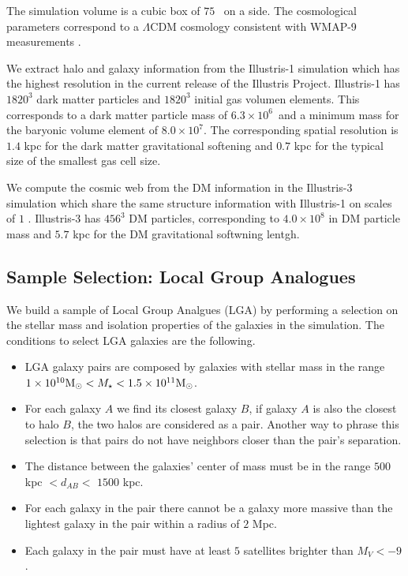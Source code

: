 \documentclass[useAMS,usenatbib,usegraphicx]{mn2e}
\newcommand{\hMpc}{{\ifmmode{h^{-1}{\rm Mpc}}\else{$h^{-1}$Mpc}\fi}}
\newcommand{\Mpc}{{\ifmmode{{\rm Mpc}}\else{Mpc}\fi}}
\newcommand{\Msun}{{\ifmmode{{\rm{M_{\odot}}}}\else{${\rm{M_{\odot}}}$}\fi}}
\begin{document}
The simulation volume is a cubic box of $75$ \hMpc\ on a side.
The cosmological parameters correspond to a $\Lambda$CDM cosmology
consistent with WMAP-9 measurements \citep{2013ApJS..208...19H}. 

We extract halo and galaxy information from the Illustris-1 simulation
which has the highest resolution in the current release of the
Illustris Project.
Illustris-1 has $1820^3$ dark matter particles and $1820^3$ initial gas
volumen elements. 
This corresponds to a dark matter particle mass of
$6.3\times 10^6$\Msun\ and a minimum mass for the baryonic volume
element of $8.0\times 10^7$\Msun. 
The corresponding spatial resolution is $1.4$ kpc for the dark matter
gravitational softening and $0.7$ kpc for the typical size of the
smallest gas cell size. 

We compute the cosmic web from the DM information in the
Illustris-3 simulation which share the same structure information with
Illustris-1 on scales of $1$ \Mpc.  
Illustris-3 has $456^3$ DM particles, corresponding to
$4.0\times 10^8$ \Msun in DM particle mass and $5.7$ kpc for the DM
gravitational softwning lentgh.
 

\subsection{Sample Selection: Local Group Analogues}

We build a sample of Local Group Analgues (LGA) by performing a selection on
the stellar mass and isolation properties of the galaxies in the
simulation. The conditions to select LGA galaxies are the following.

\begin{itemize}
\item LGA galaxy pairs are composed by galaxies with stellar mass in the
range $1\times10^{10}\Msun <M_{\star}<1.5 \times 10^{11} \Msun$.
\item For each galaxy $A$ we find its closest galaxy $B$, if galaxy $A$ is also
the closest to halo $B$, the two halos are considered as a pair. 
Another way to phrase this selection is that pairs do not have
neighbors closer than the pair's separation.
\item The distance between the galaxies' center of
  mass must be in the range $500$ kpc $<d_{AB}<$ $1500$ kpc. 
\item For each galaxy in the pair there cannot be a galaxy more
  massive than the lightest galaxy in the pair within a radius of $2$
  Mpc. 
\item Each galaxy in the pair must have at least $5$ satellites
  brighter than  $M_V<-9$.
\end{itemize}
\end{document}
